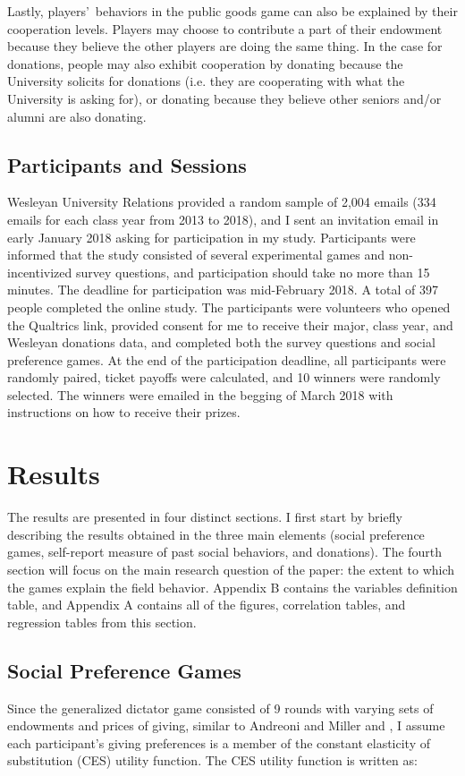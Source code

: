 \documentclass[12pt]{article}
\begin{document}
Lastly, players\rq \ behaviors in the public goods game can also be explained by their cooperation levels. Players may choose to contribute a part of their endowment because they believe the other players are doing the same thing. In the case for donations, people may also exhibit cooperation by donating because the University solicits for donations (i.e. they are cooperating with what the University is asking for), or donating because they believe other seniors and/or alumni are also donating.

	
\subsection{Participants and Sessions}

Wesleyan University Relations provided a random sample of 2,004 emails (334 emails for each class year from 2013 to 2018), and I sent an invitation email in early January 2018 asking for participation in my study. Participants were informed that the study consisted of several experimental games and non-incentivized survey questions, and participation should take no more than 15 minutes.  The deadline for participation was mid-February 2018. A total of 397 people completed the online study. The participants were volunteers who opened the Qualtrics link, provided consent for me to receive their major, class year, and Wesleyan donations data, and completed both the survey questions and social preference games. At the end of the participation deadline, all participants were randomly paired, ticket payoffs were calculated, and 10 winners were randomly selected. The winners were emailed  in the begging of March 2018 with instructions on how to receive their prizes.

\section{Results}
The results are presented in four distinct sections. I first start by briefly describing the results obtained in the three main elements (social preference games, self-report measure of past social behaviors, and donations). The fourth section will focus on the main research question of the paper: the extent to which the games explain the field behavior. Appendix B contains the variables definition table, and Appendix A contains all of the figures, correlation tables, and regression tables from this section.

\subsection{Social Preference Games}
Since the generalized dictator game consisted of 9 rounds with varying sets of endowments and prices of giving, similar to Andreoni and Miller and \cite{fisman_kariv_markovits_2007}, I assume each participant\rq s giving preferences is a member of the constant elasticity of substitution (CES) utility function.  The CES utility function is written as:\\
\end{document}
